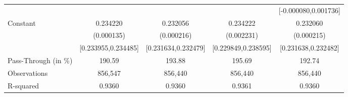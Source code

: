 {\begin{tabular}{l*{4}{c}}
                    &                     &                     &                     &[-0.000080,0.001736]         \\
Constant            &    0.234220\sym{***}&    0.232056\sym{***}&    0.234222\sym{***}&    0.232060\sym{***}\\
                    &  (0.000135)         &  (0.000216)         &  (0.002231)         &  (0.000215)         \\
                    &[0.233955,0.234485]         &[0.231634,0.232479]         &[0.229849,0.238595]         &[0.231638,0.232482]         \\
\midrule
Pass-Through (in \%)&      190.59         &      193.88         &      195.69         &      192.74         \\
Observations        &     856,547         &     856,440         &     856,440         &     856,440         \\
R-squared           &      0.9360         &      0.9360         &      0.9361         &      0.9360         \\
\bottomrule
\end{tabular}
}
